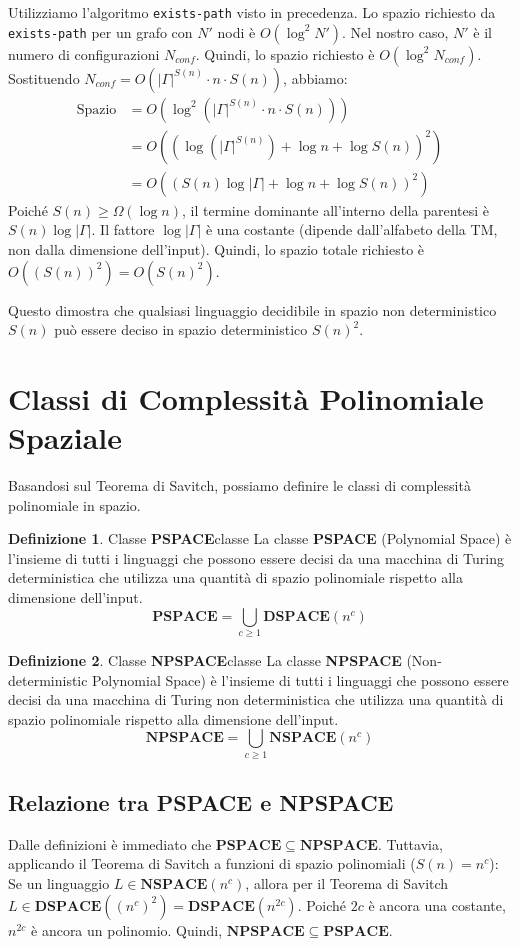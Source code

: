 \documentclass[a4paper]{article}
\theoremstyle{definition} %
\newtheorem{definition}{Definizione}
\begin{document}
\begin{enumerate}
    Utilizziamo l'algoritmo \texttt{exists-path} visto in precedenza. Lo spazio richiesto da \texttt{exists-path} per un grafo con $N'$ nodi è $O(\log^2 N')$.
    Nel nostro caso, $N'$ è il numero di configurazioni $N_{conf}$.
    Quindi, lo spazio richiesto è $O(\log^2 N_{conf})$.
    Sostituendo $N_{conf} = O(|\Gamma|^{S(n)} \cdot n \cdot S(n))$, abbiamo:
    \begin{align*} \text{Spazio} &= O(\log^2 (|\Gamma|^{S(n)} \cdot n \cdot S(n))) \\ &= O((\log (|\Gamma|^{S(n)}) + \log n + \log S(n))^2) \\ &= O((S(n)\log|\Gamma| + \log n + \log S(n))^2)\end{align*}
    Poiché $S(n) \ge \Omega(\log n)$, il termine dominante all'interno della parentesi è $S(n)\log|\Gamma|$.
    Il fattore $\log|\Gamma|$ è una costante (dipende dall'alfabeto della TM, non dalla dimensione dell'input).
    Quindi, lo spazio totale richiesto è $O((S(n))^2) = O(S(n)^2)$.
\end{enumerate}
Questo dimostra che qualsiasi linguaggio decidibile in spazio non deterministico $S(n)$ può essere deciso in spazio deterministico $S(n)^2$.

\section{Classi di Complessità Polinomiale Spaziale}
Basandosi sul Teorema di Savitch, possiamo definire le classi di complessità polinomiale in spazio.

\begin{definition}{Classe \textbf{PSPACE}}{classe}
La classe \textbf{PSPACE} (Polynomial Space) è l'insieme di tutti i linguaggi che possono essere decisi da una macchina di Turing deterministica che utilizza una quantità di spazio polinomiale rispetto alla dimensione dell'input.
\[ \mathbf{PSPACE} = \bigcup_{c \ge 1} \mathbf{DSPACE}(n^c) \]
\end{definition}

\begin{definition}{Classe \textbf{NPSPACE}}{classe}
La classe \textbf{NPSPACE} (Non-deterministic Polynomial Space) è l'insieme di tutti i linguaggi che possono essere decisi da una macchina di Turing non deterministica che utilizza una quantità di spazio polinomiale rispetto alla dimensione dell'input.
\[ \mathbf{NPSPACE} = \bigcup_{c \ge 1} \mathbf{NSPACE}(n^c) \]
\end{definition}

\subsection{Relazione tra PSPACE e NPSPACE}
Dalle definizioni è immediato che $\mathbf{PSPACE} \subseteq \mathbf{NPSPACE}$.
Tuttavia, applicando il Teorema di Savitch a funzioni di spazio polinomiali ($S(n) = n^c$):
Se un linguaggio $L \in \mathbf{NSPACE}(n^c)$, allora per il Teorema di Savitch $L \in \mathbf{DSPACE}((n^c)^2) = \mathbf{DSPACE}(n^{2c})$. Poiché $2c$ è ancora una costante, $n^{2c}$ è ancora un polinomio.
Quindi, $\mathbf{NPSPACE} \subseteq \mathbf{PSPACE}$.
\end{document}

